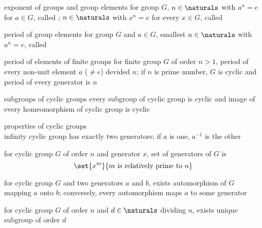 \documentclass[17pt,landscape]{foils}
\begin{document}
{\vfill



\begin{mydefinition}{exponent of groups and group elements}%
	for group $G$,
	$n\in\naturals$ with $a^n=e$ for $a\in G$,
	called ;
	$n\in\naturals$ with $x^n=e$ for every $x\in G$,
	called 
\end{mydefinition}

\vfill
\begin{mydefinition}{period of group elements}%
	for group $G$ and $a\in G$,
	smallest $n\in\naturals$ with $a^n=e$,
	called 
\end{mydefinition}

\vfill
\begin{myproposition}{period of elements of finite groups}
	for finite group $G$ of order $n>1$,
	period of every non-unit element $a$ ($\neq e$) devided $n$;
	if $n$ is prime number,
	$G$ is cyclic and period of every generator is $n$
\end{myproposition}

\vfill
\begin{myproposition}{subgroups of cyclic groups}
	every subgroup of cyclic group is cyclic
	and image of every homeomorphism of cyclic group is cyclic
\end{myproposition}

\vfill



\begin{myproposition}{properties of cyclic groups}\ \\\vspace{-2em}
	\ibit
	\iitem
		infinity cyclic group has exactly two generators; if $a$ is one, $a^{-1}$ is the other

	\iitem
		for cyclic group $G$ of order $n$ and generator $x$,
		set of generators of $G$ is
		$$
			\set{x^m}{m \mbox{ is relatively prime to }n}
		$$

	\iitem
		for cyclic group $G$ and two generators $a$ and $b$,
		exists automorphism of $G$ mapping $a$ onto $b$;
		conversely, every automorphism maps $a$ to some generator

	\iitem
		for cyclic group $G$ of order $n$ and $d\in\naturals$ dividing $n$,
		exists unique subgroup of order $d$


\end{myproposition}}
\end{document}
